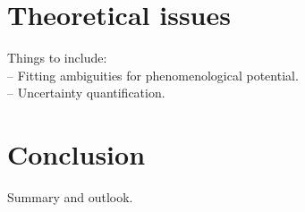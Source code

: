 \documentclass[preprintnumbers,floatfix,aps,prc,preprint,nofootinbib]{revtex4-1}
\begin{document}
\section{Theoretical issues}
\label{sec:section_4}


Things to include:
\\
-- Fitting ambiguities for phenomenological potential.
\\
-- Uncertainty quantification.


\section{Conclusion}
\label{sec:conclusion}


Summary and outlook.





\end{document}
